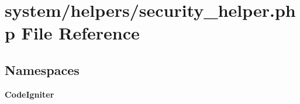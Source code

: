 \section{system/helpers/security\-\_\-helper.php File Reference}
\label{security__helper_8php}
\subsection*{Namespaces}
\begin{DoxyCompactItemize}
\item 
{\bf Code\-Igniter}
\end{DoxyCompactItemize}
